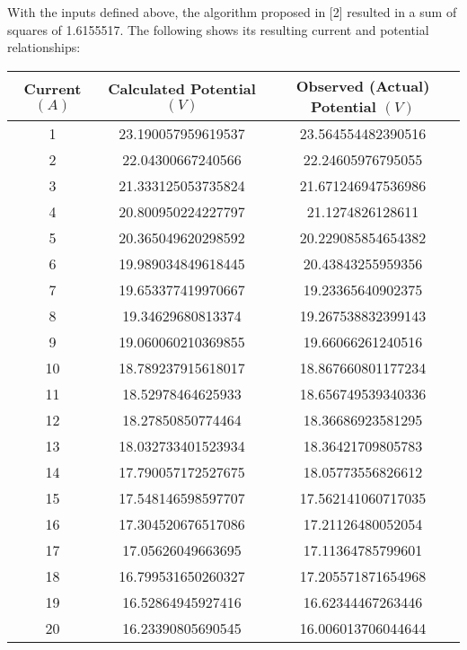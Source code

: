 \documentclass{article}
\begin{document}
With the inputs defined above, the algorithm proposed in [2] resulted in a sum of squares of 1.6155517. The following shows its resulting current and potential relationships:
\begin{center}
\begin{tabular}{| c | c | c |} 
\hline
Current $(A)$ & Calculated Potential $(V)$ & Observed (Actual) Potential $(V)$\\ 
\hline
1 & 23.190057959619537 & 23.564554482390516 \\ 
2 & 22.04300667240566 & 22.24605976795055 \\ 
3 & 21.333125053735824 & 21.671246947536986\\ 
4 & 20.800950224227797 & 21.1274826128611 \\ 
5 & 20.365049620298592 & 20.229085854654382 \\ 
6 & 19.989034849618445 & 20.43843255959356 \\ 
7 & 19.653377419970667 & 19.23365640902375 \\ 
8 & 19.34629680813374 & 19.267538832399143 \\ 
9 & 19.060060210369855 & 19.66066261240516 \\ 
10 & 18.789237915618017 & 18.867660801177234 \\ 
11 & 18.52978464625933 & 18.656749539340336 \\ 
12 & 18.27850850774464 & 18.36686923581295 \\ 
13 & 18.032733401523934 & 18.36421709805783 \\ 
14 & 17.790057172527675 & 18.05773556826612 \\ 
15 & 17.548146598597707 & 17.562141060717035 \\ 
16 & 17.304520676517086 & 17.21126480052054 \\ 
17 & 17.05626049663695 & 17.11364785799601 \\ 
18 & 16.799531650260327 & 17.205571871654968 \\ 
19 & 16.52864945927416 & 16.62344467263446 \\ 
20 & 16.23390805690545 & 16.006013706044644 \\ 
\hline
\end{tabular}
\end{center}
\end{document}
